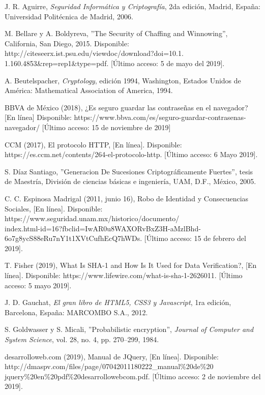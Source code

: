 \documentclass[12pt, a4paper, titlepage]{report}
\begin{document}
\begin{thebibliography}{20}
        J. R. Aguirre, \textit{Seguridad Informática y Criptografía}, 2da edición, Madrid, España: Universidad Politécnica de Madrid, 2006.
	    
		M. Bellare y A. Boldyreva, ''The Security of Chaffing and Winnowing'', California, San Diego, 2015. Disponible: http://citeseerx.ist.psu.edu/viewdoc/download?doi=10.1.\\1.160.4853\&rep=rep1\&type=pdf. [Último acceso: 5 de mayo del 2019].
	
		A. Beutelspacher, \textit{Cryptology}, edición 1994, Washington, Estados Unidos de América: Mathematical Association of America, 1994.
		
		BBVA de México (2018), ¿Es seguro guardar las contraseñas en el navegador? [En línea] Disponible: https://www.bbva.com/es/seguro-guardar-contrasenas-navegador/ [Último acceso: 15 de noviembre de 2019]   
	
        CCM (2017), El protocolo HTTP, [En línea]. Disponible: https://es.ccm.net/contents/264-el-protocolo-http. [Último acceso: 6 Mayo 2019].

        S. Díaz Santiago, ''Generacion De Sucesiones Criptográficamente Fuertes'', tesis de Maestría, División de ciencias básicas e ingeniería, UAM, D.F., México, 2005.
		
		C. C. Espinosa Madrigal (2011, junio 16), Robo de Identidad y Consecuencias Sociales, [En línea]. Disponible: https://www.seguridad.unam.mx/historico/documento/\\index.html-id=16?fbclid=IwAR0u8WAXORvBxZ3H-aMzlBhd-6o7g8ycS88eRu7nY1t1XVtCufhEcQ7hWDs. [Último acceso: 15 de febrero del 2019].
		
        T. Fisher (2019), What Is SHA-1 and How Is It Used for Data Verification?, [En línea]. Disponible: https://www.lifewire.com/what-is-sha-1-2626011. [Último acceso: 5 mayo 2019].
		
		J. D. Gauchat, \textit{El gran libro de HTML5, CSS3 y Javascript}, 1ra edición, Barcelona, España: MARCOMBO S.A., 2012. 
		
		S.  Goldwasser y S. Micali, ''Probabilistic encryption'', \textit{Journal  of Computer and System Science}, vol. 28, no. 4, pp. 270–299, 1984.
		
        desarrolloweb.com (2019), Manual de JQuery, [En línea]. Disponible: http://dmaspv.com/files/page/07042011180222\_manual\%20de\%20\\jquery\%20en\%20pdf\%20desarrollowebcom.pdf. [Último acceso: 2 de noviembre del 2019].
		

\end{thebibliography}
\end{document}
